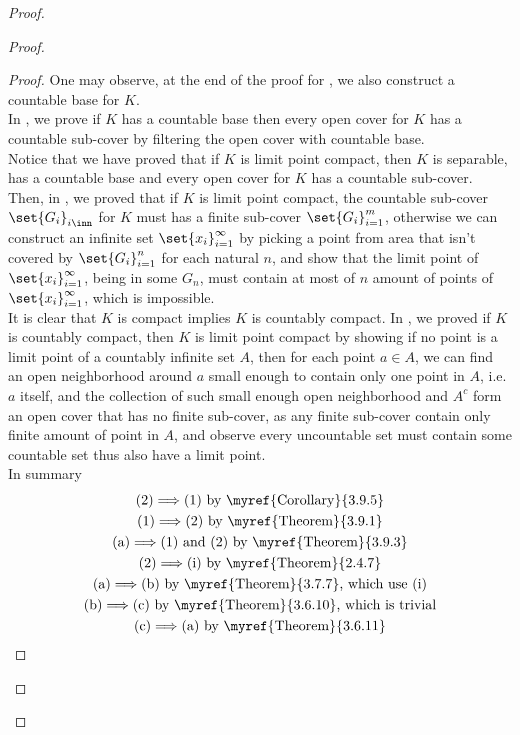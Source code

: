 \documentclass{report}
\begin{document}
\begin{proof}
\begin{proof}
\begin{proof}
One may observe, at the end of the proof for , we also construct a countable base for $K$.\\

In  , we prove if  $K$ has a countable base then every open cover for  $K$ has a countable sub-cover by filtering the open cover with countable base.\\

Notice that we have proved that if $K$ is limit point compact, then  $K$ is separable, has a countable base and every open cover for  $K$ has a countable sub-cover.\\

Then, in , we proved that if $K$ is limit point compact, the countable sub-cover $\set{G_i}_{i\inn}$ for $K$ must has a finite sub-cover $\set{G_i}_{i=1}^m$, otherwise we can construct an infinite set $\set{x_i}_{i=1}^\infty$ by picking a point from area that isn't covered by $\set{G_i}_{i=1}^n$ for each natural $n$, and show that the limit point of $\set{x_i}_{i=1}^\infty$, being in some $G_n$, must contain at most of  $n$ amount of points of  $\set{x_i}_{i=1}^\infty$, which is impossible.\\

It is clear that $K$ is compact implies $K$ is countably compact. In  , we proved if $K$ is countably compact, then $K$ is limit point compact by showing if no point is a limit point of a countably infinite set $A$, then for each point $a\in A$, we can find an open neighborhood around $a$ small enough to contain only one point in $A$, i.e.  $a$ itself, and the collection of such small enough open neighborhood and  $A^c$ form an open cover that has no finite sub-cover, as any finite sub-cover contain only finite amount of point in  $A$, and observe every uncountable set must contain some countable set thus also have a limit point.\\

In summary 
\begin{gather}
\text{(2)$\implies $(1) by \myref{Corollary}{3.9.5}}\\
\text{(1)$\implies $(2) by \myref{Theorem}{3.9.1}}\\
\text{(a)$\implies $(1) and (2) by \myref{Theorem}{3.9.3}}\\
\text{(2)$\implies $(i) by \myref{Theorem}{2.4.7}}\\
\text{(a)$\implies $(b) by \myref{Theorem}{3.7.7}, which use  (i)}\\
\text{(b)$\implies$(c) by \myref{Theorem}{3.6.10}, which is trivial}\\
\text{(c)$\implies $(a) by \myref{Theorem}{3.6.11}}
\end{gather}
\end{proof}

\end{proof}
\end{proof}
\end{document}
